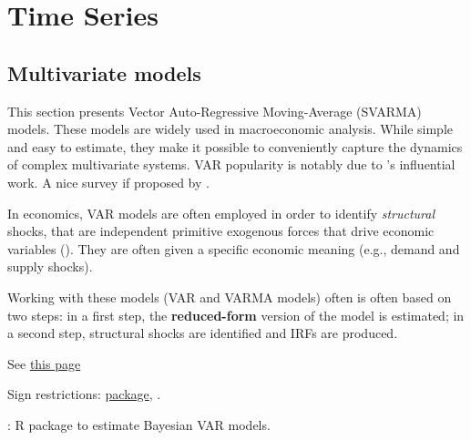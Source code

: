 \documentclass[
]{book}
\newenvironment{Shaded}{\begin{snugshade}}{\end{snugshade}}
\newcommand{\AttributeTok}[1]{\textcolor[rgb]{0.77,0.63,0.00}{#1}}
\newcommand{\CommentTok}[1]{\textcolor[rgb]{0.56,0.35,0.01}{\textit{#1}}}
\newcommand{\DecValTok}[1]{\textcolor[rgb]{0.00,0.00,0.81}{#1}}
\newcommand{\FunctionTok}[1]{\textcolor[rgb]{0.00,0.00,0.00}{#1}}
\newcommand{\NormalTok}[1]{#1}
\newcommand{\OtherTok}[1]{\textcolor[rgb]{0.56,0.35,0.01}{#1}}
\newcommand{\SpecialCharTok}[1]{\textcolor[rgb]{0.00,0.00,0.00}{#1}}
\newcommand{\StringTok}[1]{\textcolor[rgb]{0.31,0.60,0.02}{#1}}
\theoremstyle{definition}
\theoremstyle{definition}
\theoremstyle{definition}
\theoremstyle{definition}
\theoremstyle{remark}
\begin{document}
\hypertarget{TS}{%
\chapter{Time Series}\label{TS}}

\hypertarget{VAR}{%
\section{Multivariate models}\label{VAR}}

This section presents Vector Auto-Regressive Moving-Average (SVARMA) models. These models are widely used in macroeconomic analysis. While simple and easy to estimate, they make it possible to conveniently capture the dynamics of complex multivariate systems. VAR popularity is notably due to \citet{Sims_1980}'s influential work. A nice survey if proposed by \citet{Stock_Watson_2016}.

In economics, VAR models are often employed in order to identify \emph{structural} shocks, that are independent primitive exogenous forces that drive economic variables (\citet{Ramey_2016_NBER}). They are often given a specific economic meaning (e.g., demand and supply shocks).

Working with these models (VAR and VARMA models) often is often based on two steps: in a first step, the \textbf{reduced-form} version of the model is estimated; in a second step, structural shocks are identified and IRFs are produced.

\citet{Kilian_1998} See \href{https://rdrr.io/cran/VAR.etp/man/VAR.Boot.html}{this page}

Sign restrictions: \href{https://github.com/chrstdanne/VARsignR}{package}, \citet{Danne_2015}.

\citet{vars}

\citet{bvartools}: R package to estimate Bayesian VAR models.

\begin{Shaded}
\end{Shaded}
\end{document}
